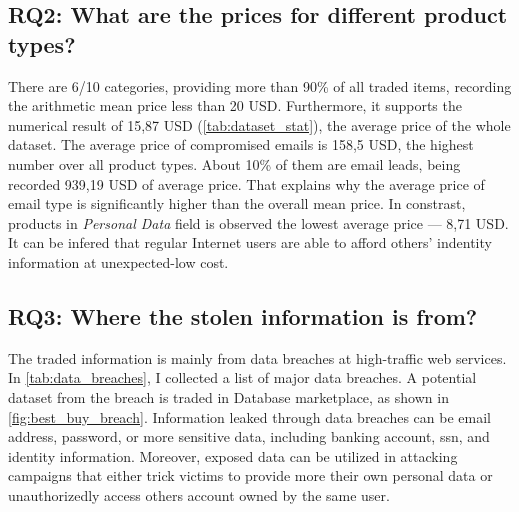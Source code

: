 \subsection{RQ2: What are the prices for different product types?}
%
There are 6/10 categories, providing more than 90\% of all traded items, 
recording the arithmetic mean price less than 20 USD\@. Furthermore, it supports
the numerical result of 15,87 USD (\autoref{tab:dataset_stat}), the average
price of the whole dataset. The average price of compromised emails is 158,5 USD,
the highest number over all product types. About 10\% of them are email leads,
being recorded 939,19 USD of average price. That explains why the average price
of email type is significantly higher than the overall mean price. In constrast,
products in \emph{Personal Data} field is observed the lowest average price ---
8,71 USD\@. It can be infered that regular Internet users are able to afford
others' indentity information at unexpected-low cost.


\subsection{RQ3: Where the stolen information is from?}
%
The traded information is mainly from data breaches at high-traffic web
services. In \autoref{tab:data_breaches}, I collected a list of major data breaches.
A potential dataset from the breach is traded in Database marketplace, as shown
in \autoref{fig:best_buy_breach}. Information leaked through data breaches can be
email address, password, or more sensitive data, including banking account,
\acrshort{ssn}, and identity information. Moreover, exposed data can be utilized
in attacking campaigns that either trick victims to provide more their own personal
data or unauthorizedly access others account owned by the same user.

